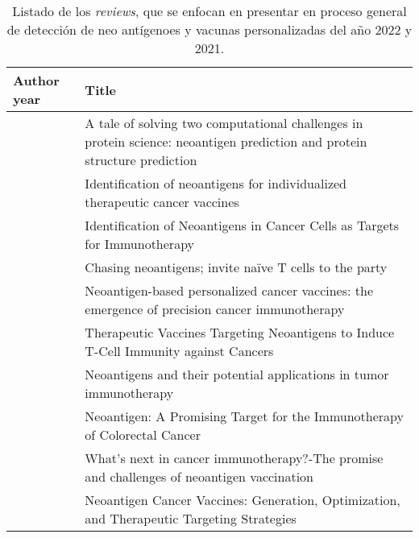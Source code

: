 \begin{table}[H]
	\caption{Listado de los \textit{reviews}, que se enfocan en presentar en proceso general de detección de neo antígenoes y vacunas personalizadas del año 2022 y 2021.}
	\label{tab:review_2022_2021}
	\begin{tabular}{p{3cm}p{10cm}}
		\textbf{Author year}                                    & \textbf{Title}                                                                                                                            \\ \hline
		\cite{tran2022tale}                   & A tale of solving two computational challenges in protein science: neoantigen prediction and protein structure prediction                 \\
		\cite{lang2022identification}         & Identification of neoantigens for individualized therapeutic cancer vaccines                                                              \\
		\cite{okada2022identification}        & Identification of Neoantigens in Cancer Cells as Targets for Immunotherapy                                                                \\
		\cite{bollineni2022chasing}           & Chasing neoantigens; invite naïve T cells to the party                                                                                    \\
		\cite{richard2022neoantigen}          & Neoantigen-based personalized cancer vaccines: the emergence of precision cancer immunotherapy                                            \\
		\cite{pao2022therapeutic}             & Therapeutic Vaccines Targeting Neoantigens to Induce T-Cell Immunity against Cancers                                                      \\
		\cite{fang2022neoantigens}            & Neoantigens and their potential applications in tumor immunotherapy                                                                       \\
		\cite{zheng2022neoantigen}            & Neoantigen: A Promising Target for the Immunotherapy of Colorectal Cancer                                                                 \\
		\cite{redwood2022s}                   & What's next in cancer immunotherapy?-The promise and challenges of neoantigen vaccination                                                 \\
		\cite{reynolds2022neoantigen}         & Neoantigen Cancer Vaccines: Generation, Optimization, and Therapeutic Targeting Strategies                                                \\

\end{tabular}
\end{table}
